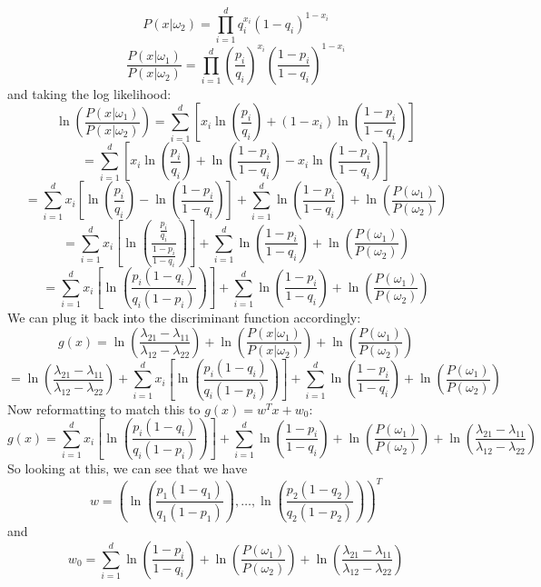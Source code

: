 \documentclass{article}
\begin{document}
{\[\]
\[
  P(x | \omega_2) = \prod_{i=1}^{d} q_i^{x_i} (1-q_i)^{1-x_i}
\]
\[
  \frac{P(x | \omega_1)}{P(x | \omega_2)} = \prod_{i=1}^{d} (\frac{p_i}{q_i})^{x_i} (\frac{1 - p_i}{1 - q_i})^{1 - x_i}
\]
and taking the log likelihood:
\[
  \ln(\frac{P(x | \omega_1)}{P(x | \omega_2)}) = \sum_{i=1}^{d}[x_i \ln(\frac{p_i}{q_i}) + (1 - x_i)\ln(\frac{1 - p_i}{1 - q_i})]
\]
\[
  = \sum_{i=1}^{d}[x_i \ln(\frac{p_i}{q_i}) + \ln(\frac{1 - p_i}{1 - q_i}) - x_i\ln(\frac{1 - p_i}{1 - q_i})]
\]
\[
  = \sum_{i=1}^{d} x_i [\ln(\frac{p_i}{q_i}) - \ln(\frac{1 - p_i}{1 - q_i})] + \sum_{i=1}^{d} \ln(\frac{1 - p_i}{1 - q_i}) + \ln(\frac{P(\omega_1)}{P(\omega_2)})
\]
\[
  = \sum_{i=1}^{d} x_i [\ln(\frac{\frac{p_i}{q_i}}{\frac{1 - p_i}{1 - q_i}})] + \sum_{i=1}^{d} \ln(\frac{1 - p_i}{1 - q_i}) + \ln(\frac{P(\omega_1)}{P(\omega_2)})
\]
\[
  = \sum_{i=1}^{d} x_i [\ln(\frac{p_i(1 - q_i)}{q_i(1 - p_i)})] + \sum_{i=1}^{d} \ln(\frac{1 - p_i}{1 - q_i}) + \ln(\frac{P(\omega_1)}{P(\omega_2)})
\]
We can plug it back into the discriminant function accordingly:
\[
  g(x) = \ln(\frac{\lambda_{21} - \lambda_{11}}{\lambda_{12} - \lambda_{22}}) + \ln(\frac{P(x | \omega_1)}{P(x | \omega_2)}) + \ln(\frac{P(\omega_1)}{P(\omega_2)})
\]
\[
  = \ln(\frac{\lambda_{21} - \lambda_{11}}{\lambda_{12} - \lambda_{22}}) + \sum_{i=1}^{d} x_i [\ln(\frac{p_i(1 - q_i)}{q_i(1 - p_i)})] + \sum_{i=1}^{d} \ln(\frac{1 - p_i}{1 - q_i}) + \ln(\frac{P(\omega_1)}{P(\omega_2)})
\]
Now reformatting to match this to \(g(x) = w^Tx + w_0\):
\[
  g(x) = \sum_{i=1}^{d} x_i [\ln(\frac{p_i(1 - q_i)}{q_i(1 - p_i)})] + \sum_{i=1}^{d} \ln(\frac{1 - p_i}{1 - q_i}) + \ln(\frac{P(\omega_1)}{P(\omega_2)}) + \ln(\frac{\lambda_{21} - \lambda_{11}}{\lambda_{12} - \lambda_{22}})
\]
So looking at this, we can see that we have 
\[
  \boxed{w = (\ln(\frac{p_1(1 - q_1)}{q_1(1 - p_1)}), \dots, \ln(\frac{p_2(1 - q_2)}{q_2(1 - p_2)}))^T}
\]
and 
\[
  \boxed{w_0 = \sum_{i=1}^{d} \ln(\frac{1 - p_i}{1 - q_i}) + \ln(\frac{P(\omega_1)}{P(\omega_2)}) + \ln(\frac{\lambda_{21} - \lambda_{11}}{\lambda_{12} - \lambda_{22}})}
\]

}
\end{document}
